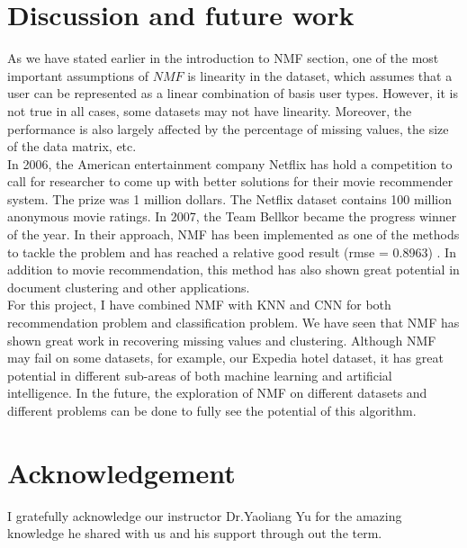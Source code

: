 \documentclass[11pt]{article} %
\begin{document}
\section{Discussion and future work}
As we have stated earlier in the introduction to NMF section, one of the most important assumptions of $NMF$ is linearity in the dataset, which assumes that a user can be represented as a linear combination of basis user types. However, it is not true in all cases, some datasets may not have linearity. Moreover, the performance is also largely affected by the percentage of missing values, the size of the data matrix, etc.\\
In 2006, the American entertainment company Netflix has hold a competition to call for researcher to come up with better solutions for their movie recommender system. The prize was 1 million dollars. The Netflix dataset contains 100 million anonymous movie ratings\cite{netflix}. In 2007, the Team Bellkor became the progress winner of the year. In their approach, NMF has been implemented as one of the methods to tackle the problem and has reached a relative good result (rmse = 0.8963) \citep[p.10]{netflix2007}. In addition to movie recommendation, this method has also shown great potential in document clustering and other applications.\\
For this project, I have combined NMF with KNN and CNN for both recommendation problem and classification problem. We have seen that NMF has shown great work in recovering missing values and clustering. Although NMF may fail on some datasets, for example, our Expedia hotel dataset, it has great potential in different sub-areas of both machine learning and artificial intelligence. In the future, the exploration of NMF on different datasets and different problems can be done to fully see the potential of this algorithm.\\

\section{Acknowledgement}
I gratefully acknowledge our instructor Dr.Yaoliang Yu for the amazing knowledge he shared with us and his support through out the term.



\end{document}
